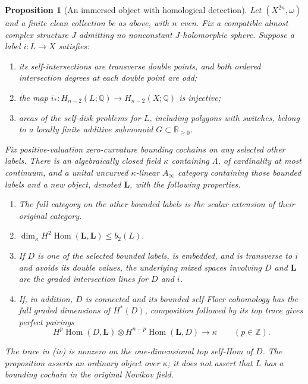 \documentclass[11pt]{article}
\numberwithin{equation}{section}
\newtheorem{proposition}[theorem]{Proposition}
\theoremstyle{definition}
\theoremstyle{remark}
\newcommand{\Q}{\mathbb Q}
\newcommand{\R}{\mathbb R}
\newcommand{\Z}{\mathbb Z}
\newcommand{\Hom}{\operatorname{Hom}}
\begin{document}
\begin{proposition}[An immersed object with homological detection]
 \label{prop:immersed-package}
Let $(X^{2n},\omega)$ and a finite clean collection be as above, with
$n$ even.  Fix a compatible almost complex structure $J$ admitting no
nonconstant $J$-holomorphic sphere.  Suppose a label $i:L\to X$ satisfies:
\begin{enumerate}[label=(\alph*)]
 \item its self-intersections are transverse double points, and both
 ordered intersection degrees at each double point are odd;
 \item the map
 $i_*:H_{n-2}(L;\Q)\longrightarrow H_{n-2}(X;\Q)$ is injective;
 \item areas of the self-disk problems for $L$, including polygons with
 switches, belong to a locally finite additive submonoid
 $G\subset\R_{\geq0}$.
\end{enumerate}
Fix positive-valuation zero-curvature bounding cochains on any selected
other labels.  There is an algebraically closed field $\kappa$ containing
$\Lambda$, of cardinality at most continuum, and a unital uncurved
$\kappa$-linear $A_\infty$ category containing those bounded labels and
a new object, denoted $\mathbf L$, with the following properties.
\begin{enumerate}[label=(\roman*)]
 \item The full category on the other bounded labels is the scalar
 extension of their original category.
 \item $\dim_\kappa H^2\Hom(\mathbf L,\mathbf L)\leq b_2(L)$.
 \item If $D$ is one of the selected bounded labels, is embedded,
 and is transverse to $i$ and avoids its
 double values, the underlying mixed spaces involving $D$ and
 $\mathbf L$ are the graded intersection lines for $D$ and $i$.
 \item If, in addition, $D$ is connected and its bounded self-Floer
 cohomology has the full graded dimensions of $H^*(D)$, composition
 followed by its top trace gives perfect pairings
 \[
 H^p\Hom(D,\mathbf L)\otimes
 H^{n-p}\Hom(\mathbf L,D)\longrightarrow\kappa
 \qquad(p\in\Z).
 \]
\end{enumerate}
The trace in (iv) is nonzero on the one-dimensional top self-Hom of
$D$.  The proposition asserts an ordinary object over $\kappa$; it does
not assert that $L$ has a bounding cochain in the original Novikov field.
\end{proposition}
\end{document}
